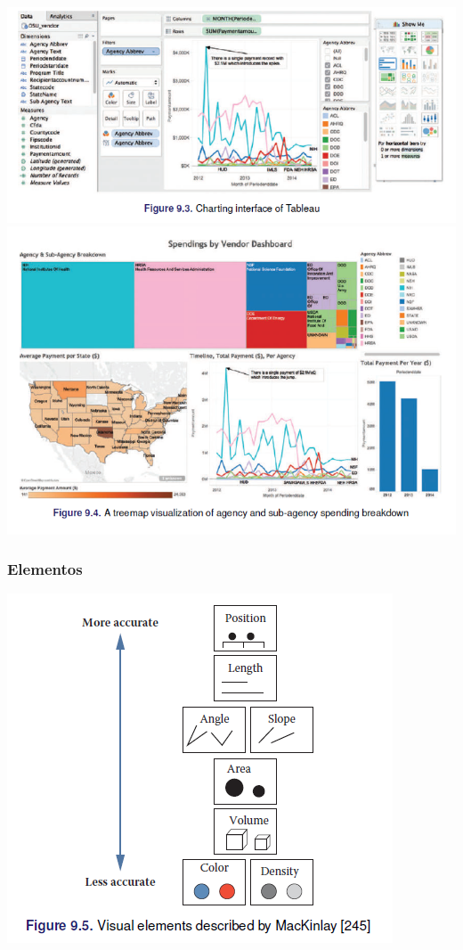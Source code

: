 \documentclass[
]{book}
\begin{document}
\includegraphics{images/bd9.PNG}
\includegraphics{images/bd10.PNG}

\hypertarget{elementos}{%
\subsubsection{Elementos}\label{elementos}}

\includegraphics{images/bd11.PNG}
\end{document}
